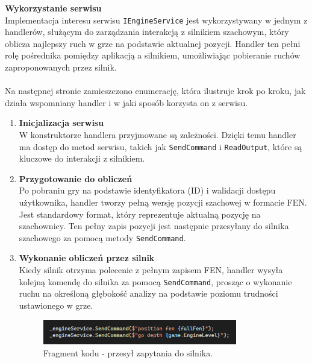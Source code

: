 \documentclass[12pt,a4paper]{article}
\begin{document}
\noindent \textbf{Wykorzystanie serwisu}\\
Implementacja interesu serwisu \texttt{IEngineService} jest wykorzystywany w jednym z handlerów, służącym do zarządzania interakcją z silnikiem szachowym, który oblicza najlepszy ruch w grze na podstawie aktualnej pozycji. Handler ten pełni rolę pośrednika pomiędzy aplikacją a silnikiem, umożliwiając pobieranie ruchów zaproponowanych przez silnik.
\\\\
Na następnej stronie zamieszczono enumerację, która ilustruje krok po kroku, jak działa wspomniany handler i w jaki sposób korzysta on z serwisu.

\newpage

\begin{enumerate}
    \item \textbf{Inicjalizacja serwisu}\\
    W konstruktorze handlera przyjmowane są zależności. Dzięki temu handler ma dostęp do metod serwisu, takich jak \texttt{SendCommand} i \texttt{ReadOutput}, które są kluczowe do interakcji z silnikiem.

    \item \textbf{Przygotowanie do obliczeń}\\
    Po pobraniu gry na podstawie identyfikatora (ID) i walidacji dostępu użytkownika, handler tworzy pełną wersję pozycji szachowej w formacie FEN. Jest standardowy format, który reprezentuje aktualną pozycję na szachownicy. Ten pełny zapis pozycji jest następnie przesyłany do silnika szachowego za pomocą metody \texttt{SendCommand}.

    \item \textbf{Wykonanie obliczeń przez silnik}\\
    Kiedy silnik otrzyma polecenie z pełnym zapisem FEN, handler wysyła kolejną komendę do silnika za pomocą \texttt{SendCommand}, prosząc o wykonanie ruchu na określoną głębokość analizy na podstawie poziomu trudności ustawionego w grze.

    \begin{figure}[h!]
        \centering
        \includegraphics[width=0.8\textwidth]{images/ex_send_command.png}
        \caption{Fragment kodu - przesył zapytania do silnika.}
    \end{figure}


\end{enumerate}
\end{document}

